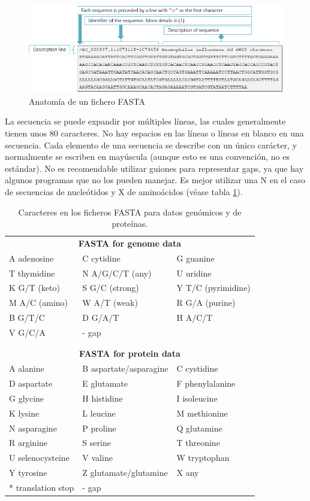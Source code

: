 \begin{figure}[htbp]
\centering
\includegraphics[width = \textwidth]{figs/fasta.png}
\caption{Anatomía de un fichero FASTA}
\label{fig:fasta}
\end{figure}

La secuencia se puede expandir por múltiples líneas, las cuales generalmente tienen unos 80 caracteres. No hay espacios en las líneas o líneas en blanco en una secuencia. Cada elemento de una secuencia se describe con un único carácter, y normalmente se escriben en mayúscula (aunque esto es una convención, no es estándar). No es recomendable utilizar guiones para representar gaps, ya que hay algunos programas que no los pueden manejar. Es mejor utilizar una N en el caso de secuencias de nucleótidos y X de aminoácidos (véase tabla \ref{tab:fasta-data}).

\begin{table}[htbp]
\centering
\begin{tabular}{l l l}
\multicolumn{3}{c}{\textbf{FASTA for genome data}}\\
A adenosine & C cytidine & G guanine \\
T thymidine & N A/G/C/T (any) & U uridine \\
K G/T (keto) & S G/C (strong) & Y T/C (pyrimidine) \\
M A/C (amino) & W A/T (weak) & R G/A (purine)\\
B G/T/C & D G/A/T & H A/C/T \\
V G/C/A & - gap & \\ \\ \hline \\
\multicolumn{3}{c}{\textbf{FASTA for protein data}}\\
A alanine & B aspartate/asparagine &  C cystidine\\
D aspartate & E glutamate & F phenylalanine\\
G glycine & H histidine & I isoleucine \\
K lysine & L leucine & M methionine \\
N asparagine & P proline & Q glutamine\\
R arginine & S serine & T threonine\\
U selenocysteine & V valine & W tryptophan\\
Y tyrosine & Z glutamate/glutamine & X any \\
* translation stop & - gap \\
\end{tabular}
\caption{Caracteres en los ficheros FASTA para datos genómicos y de proteínas.}
\label{tab:fasta-data}
\end{table}

